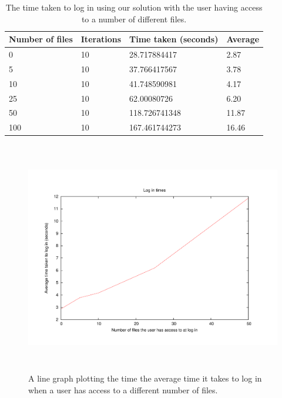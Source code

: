 \documentclass[12pt, titlepage]{article}
\begin{document}
\begin{table}[h]
	\begin{center}
    	\begin{tabular}{ | l | l | l | l |}
    \hline
    \textbf{Number of files} & \textbf{Iterations} & \textbf{Time taken 		(seconds)} & \textbf{Average} \\ \hline
    
    0  & 10 & 28.717884417 & 2.87 \\ \hline
    5  & 10 & 37.766417567 & 3.78 \\ \hline
    10 & 10 & 41.748590981 & 4.17 \\ \hline
    25 & 10 & 62.00080726 & 6.20 \\ \hline
    50 & 10 & 118.726741348 & 11.87 \\ \hline
    100 & 10 & 167.461744273 & 16.46 \\ \hline
    
    \end{tabular}
    \caption{The time taken to log in using our solution with the user having access to a number of different files.}
    \label{tab:loginBenchmark}
   \end{center}
\end{table}
    
\begin{figure}[!t]
\centerline{\includegraphics[height=4.0in,width=7in,angle=0]{plots/login/loginTimes.pdf}}
\caption{A line graph plotting the time the average time it takes to log in when a user has access to a different number of files.}
\label{fig:loginLineGraph}
\end{figure}
\end{document}
